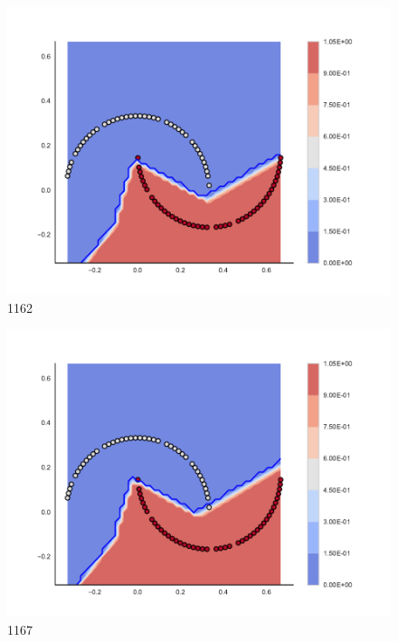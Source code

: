 \begin{subfigure}[b]{0.09\textwidth}
    \includegraphics[clip, trim=2.35cm 1.75cm 4.5cm 0cm,width=\textwidth]{img/convergence/1162.pdf}
    \caption{1162}
    \label{fig:convergence_1162}
\end{subfigure}
%
\begin{subfigure}[b]{0.09\textwidth}
    \includegraphics[clip, trim=2.35cm 1.75cm 4.5cm 0cm,width=\textwidth]{img/convergence/1167.pdf}
    \caption{1167}
    \label{fig:convergence_1167}
\end{subfigure}
%

